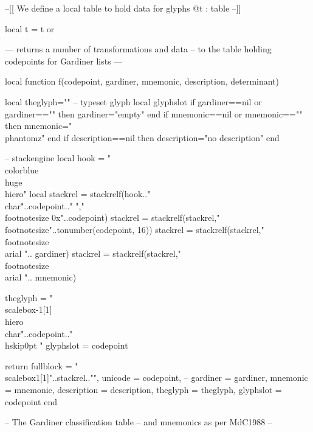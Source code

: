 --[[
We define a local table to hold data for glyphs
@t : table
--]]

local t = t or {}

--- returns a number of transformations and data
-- to the table holding codepoints for Gardiner lists
---

local function f(codepoint, gardiner, mnemonic,
                 description, determinant)

     local theglyph=""  -- typeset glyph
     local glyphslot
  if gardiner==nil or gardiner=="" then gardiner="empty" end
     if mnemonic==nil or mnemonic=="" then mnemonic="\\phantom{z}" end
     if description==nil then description="no description" end

-- stackengine
   local hook = "\\color{blue}\\huge\\hiero"
   local stackrel = stackrelf(hook.."\\char\""..codepoint.." ","\\footnotesize 0x"..codepoint)
   stackrel = stackrelf(stackrel,"\\footnotesize"..tonumber(codepoint, 16))
   stackrel = stackrelf(stackrel,"\\footnotesize \\arial ".. gardiner)
   stackrel = stackrelf(stackrel,"\\footnotesize \\arial ".. mnemonic)

   theglyph = "\\scalebox{-1}[1]{\\hiero\\char\""..codepoint.."\\hskip0pt }"
   glyphslot = codepoint

return {  fullblock     = "\\scalebox{1}[1]{"..stackrel.."}",
          unicode       = codepoint, --
          gardiner      = gardiner,
          mnemonic      = mnemonic,
          description   = description,
          theglyph      = theglyph,
          glyphslot     = codepoint}
end

-- The Gardiner classification table
-- and mnemonics as per MdC1988
--

